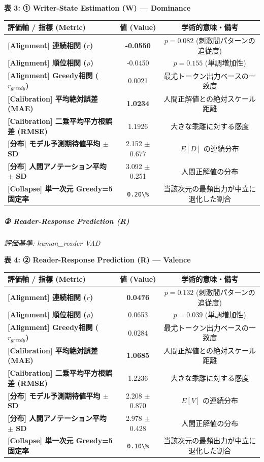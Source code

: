 \textbf{表 3: ① Writer-State Estimation (W) — Dominance}
\begin{center}
\small
\begin{tabular}{lcc}
\toprule
\textbf{評価軸 / 指標 (Metric)} & \textbf{値 (Value)} & \textbf{学術的意味・備考} \\
\midrule
\textbf{[Alignment] 連続相関 ($r$)} & \textbf{-0.0550} & $p = 0.082 $ (刺激間パターンの追従度) \\
\textbf{[Alignment] 順位相関 ($\rho$)} & -0.0450 & $p = 0.155 $ (単調増加性) \\
\textbf{[Alignment] Greedy相関 ($r_{greedy}$)} & 0.0021 & 最尤トークン出力ベースの一致度 \\
\textbf{[Calibration] 平均絶対誤差 (MAE)} & \textbf{1.0234} & 人間正解値との絶対スケール距離 \\
\textbf{[Calibration] 二乗平均平方根誤差 (RMSE)} & 1.1926 & 大きな乖離に対する感度 \\
\textbf{[分布] モデル予測期待値平均 $\pm$ SD} & 2.152 $\pm$ 0.677 & $E[D]$ の連続分布 \\
\textbf{[分布] 人間アノテーション平均 $\pm$ SD} & 3.092 $\pm$ 0.251 & 人間正解値の分布 \\
\textbf{[Collapse] 単一次元 Greedy=5 固定率} & \texttt{0.20\textbackslash{}\%} & 当該次元の最頻出力が中立に退化した割合 \\
\bottomrule
\end{tabular}
\end{center}


\subparagraph{② Reader-Response Prediction (R)}
\textit{評価基準: human\_reader VAD}

\textbf{表 4: ② Reader-Response Prediction (R) — Valence}
\begin{center}
\small
\begin{tabular}{lcc}
\toprule
\textbf{評価軸 / 指標 (Metric)} & \textbf{値 (Value)} & \textbf{学術的意味・備考} \\
\midrule
\textbf{[Alignment] 連続相関 ($r$)} & \textbf{0.0476} & $p = 0.132 $ (刺激間パターンの追従度) \\
\textbf{[Alignment] 順位相関 ($\rho$)} & 0.0653 & $p = 0.039 $ (単調増加性) \\
\textbf{[Alignment] Greedy相関 ($r_{greedy}$)} & 0.0284 & 最尤トークン出力ベースの一致度 \\
\textbf{[Calibration] 平均絶対誤差 (MAE)} & \textbf{1.0685} & 人間正解値との絶対スケール距離 \\
\textbf{[Calibration] 二乗平均平方根誤差 (RMSE)} & 1.2236 & 大きな乖離に対する感度 \\
\textbf{[分布] モデル予測期待値平均 $\pm$ SD} & 2.208 $\pm$ 0.870 & $E[V]$ の連続分布 \\
\textbf{[分布] 人間アノテーション平均 $\pm$ SD} & 2.978 $\pm$ 0.428 & 人間正解値の分布 \\
\textbf{[Collapse] 単一次元 Greedy=5 固定率} & \texttt{0.10\textbackslash{}\%} & 当該次元の最頻出力が中立に退化した割合 \\
\bottomrule
\end{tabular}
\end{center}


